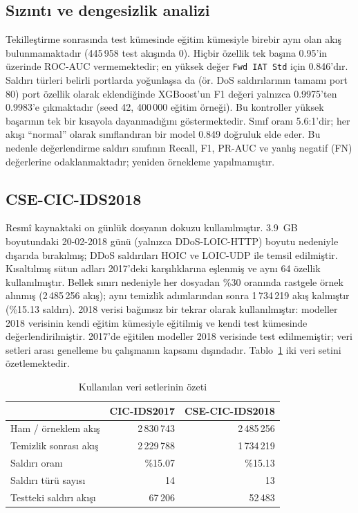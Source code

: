 \documentclass[conference]{IEEEtran}
\begin{document}
\subsection{Sızıntı ve dengesizlik analizi}
Tekilleştirme sonrasında test kümesinde eğitim kümesiyle birebir aynı olan akış bulunmamaktadır (445\,958 test akışında 0). Hiçbir özellik tek başına 0.95'in üzerinde ROC-AUC vermemektedir; en yüksek değer \texttt{Fwd IAT Std} için 0.846'dır. Saldırı türleri belirli portlarda yoğunlaşsa da (ör. DoS saldırılarının tamamı port 80) port özellik olarak eklendiğinde XGBoost'un F1 değeri yalnızca 0.9975'ten 0.9983'e çıkmaktadır (seed 42, 400\,000 eğitim örneği). Bu kontroller yüksek başarının tek bir kısayola dayanmadığını göstermektedir. Sınıf oranı 5.6:1'dir; her akışı ``normal'' olarak sınıflandıran bir model 0.849 doğruluk elde eder. Bu nedenle değerlendirme saldırı sınıfının Recall, F1, PR-AUC ve yanlış negatif (FN) değerlerine odaklanmaktadır; yeniden örnekleme yapılmamıştır.

\subsection{CSE-CIC-IDS2018}
Resmî kaynaktaki on günlük dosyanın dokuzu kullanılmıştır. 3.9~GB boyutundaki 20-02-2018 günü (yalnızca DDoS-LOIC-HTTP) boyutu nedeniyle dışarıda bırakılmış; DDoS saldırıları HOIC ve LOIC-UDP ile temsil edilmiştir. Kısaltılmış sütun adları 2017'deki karşılıklarına eşlenmiş ve aynı 64 özellik kullanılmıştır. Bellek sınırı nedeniyle her dosyadan \%30 oranında rastgele örnek alınmış (2\,485\,256 akış); aynı temizlik adımlarından sonra 1\,734\,219 akış kalmıştır (\%15.13 saldırı). 2018 verisi bağımsız bir tekrar olarak kullanılmıştır: modeller 2018 verisinin kendi eğitim kümesiyle eğitilmiş ve kendi test kümesinde değerlendirilmiştir. 2017'de eğitilen modeller 2018 verisinde test edilmemiştir; veri setleri arası genelleme bu çalışmanın kapsamı dışındadır. Tablo~\ref{tab:data} iki veri setini özetlemektedir.

\begin{table}[t]
\caption{Kullanılan veri setlerinin özeti}
\label{tab:data}
\centering
\begin{tabular}{lrr}
\toprule
 & CIC-IDS2017 & CSE-CIC-IDS2018 \\
\midrule
Ham / örneklem akış & 2\,830\,743 & 2\,485\,256 \\
Temizlik sonrası akış & 2\,229\,788 & 1\,734\,219 \\
Saldırı oranı & \%15.07 & \%15.13 \\
Saldırı türü sayısı & 14 & 13 \\
Testteki saldırı akışı & 67\,206 & 52\,483 \\
\bottomrule
\end{tabular}
\end{table}
\end{document}
